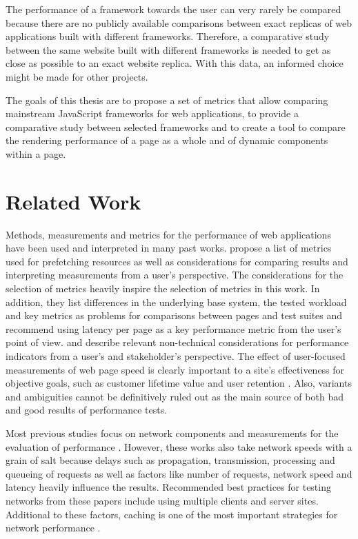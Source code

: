 \documentclass[a4paper, 12pt]{article}
\begin{document}
The performance of a framework towards the user can very rarely be compared because there are no publicly available comparisons between exact replicas of web applications built with different frameworks.
Therefore, a comparative study between the same website built with different frameworks is needed to get as close as possible to an exact website replica.
With this data, an informed choice might be made for other projects.

The goals of this thesis are to propose a set of metrics that allow comparing mainstream JavaScript frameworks for web applications, to provide a comparative study between selected frameworks and to create a tool to compare the rendering performance of a page as a whole and of dynamic components within a page.

\section{Related Work}\label{sec:relatedwork}
Methods, measurements and metrics for the performance of web applications have been used and interpreted in many past works.
\cite{webprefetching} propose a list of metrics used for prefetching resources as well as considerations for comparing results and interpreting measurements from a user's perspective.
The considerations for the selection of metrics heavily inspire the selection of metrics in this work.
In addition, they list differences in the underlying base system, the tested workload and key metrics as problems for comparisons between pages and test suites and recommend using latency per page as a key performance metric from the user's point of view.
\cite{sevenpitfalls} and \cite{webprophet} describe relevant non-technical considerations for performance indicators from a user's and stakeholder's perspective.
The effect of user-focused measurements of web page speed is clearly important to a site's effectiveness for objective goals, such as customer lifetime value and user retention \citep{webprophet,sevenpitfalls,effectsofwebpagecontents}.
Also, variants and ambiguities cannot be definitively ruled out as the main source of both bad and good results of performance tests. 

Most previous studies focus on network components and measurements for the evaluation of performance \citep{analyzingfactors,highperformancebrowsernetworking,measuringandmitigatinwebperformance}.
However, these works also take network speeds with a grain of salt because delays such as propagation, transmission, processing and queueing of requests as well as factors like number of requests, network speed and latency heavily influence the results.
Recommended best practices for testing networks from these papers include using multiple clients and server sites.
Additional to these factors, caching is one of the most important strategies for network performance \citep{whatifanalysis,measuringandmitigatinwebperformance}.
\end{document}
